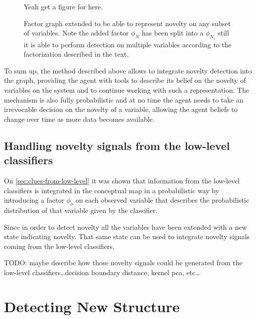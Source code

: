 \begin{figure}[h]
\centering
Yeah get a figure for here.
\caption{\label{fig:multi-factorized-threshold}Factor graph extended to be able
         to represent novelty on any subset of variables. Note the added factor
         $\phi_N$ has been split into a $\phi_{N_i}$ still it is able to perform
         detection on multiple variables according to the factorization
         described in the text.}
\end{figure}


To sum up, the method described above allows to integrate novelty detection
into the graph, providing the agent with tools to describe its belief on the
novelty of variables on the system and to continue working with such a
representation. The mechanism is also fully probabilistic and at no time
the agent needs to take an irrevocable decision on the novelty of a variable,
allowing the agent beliefs to change over time as more data becomes available.


\subsection{Handling novelty signals from the low-level classifiers}
On \autoref{sec:clues-from-low-level} it was shown that information from the
low-level classifiers is integrated in the conceptual map in a probabilistic
way by introducing a factor $\phi_o$ on each observed variable that describes
the probabilistic distribution of that variable given by the classifier.

Since in order to detect novelty all the variables have been extended with a
new state indicating novelty. That same state can be used to integrate novelty
signals coming from the low-level classifiers.

TODO: maybe describe how those novelty signals could be generated from the
low-level classifiers\dots decision boundary distance, kernel pca, etc\dots


\section{Detecting New Structure}

